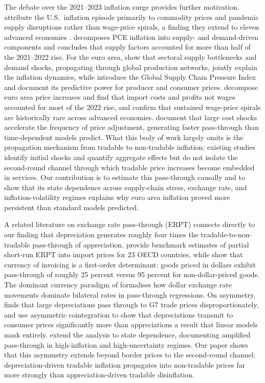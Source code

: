 \documentclass[a4paper,12pt]{article}
\begin{document}
The debate over the 2021--2023 inflation surge provides further motivation.  attribute the U.S.\ inflation episode primarily to commodity prices and pandemic supply disruptions rather than wage-price spirals, a finding they extend to eleven advanced economies \cite{BernankeBlanchardMulti}.  decomposes PCE inflation into supply- and demand-driven components and concludes that supply factors accounted for more than half of the 2021--2022 rise. For the euro area,  show that sectoral supply bottlenecks and demand shocks, propagating through global production networks, jointly explain the inflation dynamics, while  introduce the Global Supply Chain Pressure Index and document its predictive power for producer and consumer prices.  decompose euro area price increases and find that import costs and profits not wages accounted for most of the 2022 rise, and  confirm that sustained wage-price spirals are historically rare across advanced economies.  document that large cost shocks accelerate the frequency of price adjustment, generating faster pass-through than time-dependent models predict. What this body of work largely omits is the propagation mechanism from tradable to non-tradable inflation: existing studies identify initial shocks and quantify aggregate effects but do not isolate the second-round channel through which tradable price increases become embedded in services. Our contribution is to estimate this pass-through causally and to show that its state dependence across supply-chain stress, exchange rate, and inflation-volatility regimes explains why euro area inflation proved more persistent than standard models predicted.

A related literature on exchange rate pass-through (ERPT) connects directly to our finding that depreciation generates roughly four times the tradable-to-non-tradable pass-through of appreciation.  provide benchmark estimates of partial short-run ERPT into import prices for 23 OECD countries, while  show that currency of invoicing is a first-order determinant: goods priced in dollars exhibit pass-through of roughly 25 percent versus 95 percent for non-dollar-priced goods. The dominant currency paradigm of  formalises how dollar exchange rate movements dominate bilateral rates in pass-through regressions. On asymmetry,  finds that large depreciations pass through to G7 trade prices disproportionately, and  use asymmetric cointegration to show that depreciations transmit to consumer prices significantly more than appreciations a result that linear models mask entirely.  extend the analysis to state dependence, documenting amplified pass-through in high-inflation and high-uncertainty regimes. Our paper shows that this asymmetry extends beyond border prices to the second-round channel: depreciation-driven tradable inflation propagates into non-tradable prices far more strongly than appreciation-driven tradable disinflation.
\end{document}
